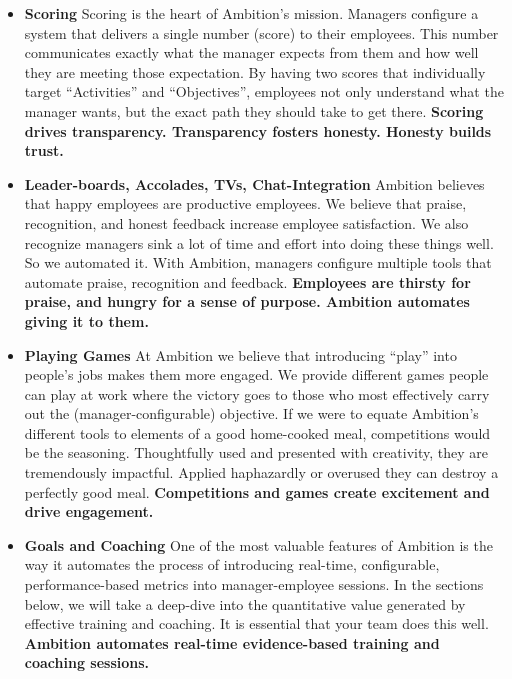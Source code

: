 \documentclass[paper=a4, fontsize=11pt abstract]{scrartcl}
\numberwithin{equation}{section}		%
\numberwithin{figure}{section}			%
\numberwithin{table}{section}				%
\begin{document}
\begin{itemize}
    \item \textbf{Scoring}
    Scoring is the heart of Ambition's mission.
    Managers configure a system that delivers a single number (score) to their employees.
    This number communicates exactly what the manager expects from them and how well they are meeting those expectation.
    By having two scores that individually target ``Activities'' and ``Objectives'', employees not only understand what the manager wants, but the exact path they should take to get there.
    \textbf{Scoring drives transparency. Transparency fosters honesty.  Honesty builds trust.}
    
    \item \textbf{Leader-boards, Accolades, TVs, Chat-Integration}
    Ambition believes that happy employees are productive employees.
    We believe that praise, recognition, and honest feedback increase employee satisfaction.
    We also recognize managers sink a lot of time and effort into doing these things well.
    So we automated it.
    With Ambition, managers configure multiple tools that automate praise, recognition and feedback.
    \textbf{Employees are thirsty for praise, and hungry for a sense of purpose.
    Ambition automates giving it to them.}
    
    \item \textbf{Playing Games} At Ambition we believe that introducing ``play'' into people's jobs makes them more engaged.  We provide different games people can play at work where the victory goes to those who most effectively carry out the (manager-configurable) objective.  If we were to equate Ambition's different tools to elements of a good home-cooked meal, competitions would be the seasoning.  Thoughtfully used and presented with creativity, they are tremendously impactful. Applied haphazardly or overused they can destroy a perfectly good meal. \textbf{Competitions and games create excitement and drive engagement.}
    
    \item \textbf{Goals and Coaching} One of the most valuable features of Ambition is the way it automates the process of introducing real-time, configurable, performance-based metrics into manager-employee sessions.  In the sections below, we will take a deep-dive into the quantitative value generated by effective training and coaching.  It is essential that your team does this well. \textbf{Ambition automates real-time evidence-based training and coaching sessions.}
   

\end{itemize}
\end{document}
